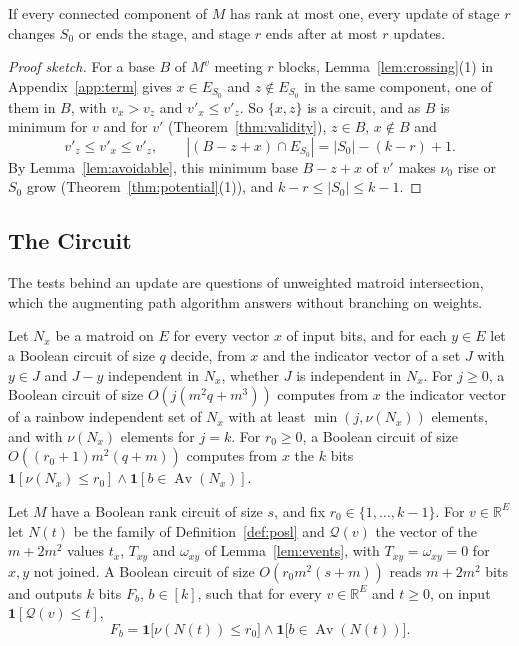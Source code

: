 \documentclass[runningheads,envcountsame]{llncs}
\newcommand{\R}{\mathbb R}
\newcommand{\Av}{\operatorname{Av}}
\begin{document}
\begin{corollary}
\label{cor:rankone}
If every connected component of $M$ has rank at most one, every update of stage $r$
changes $S_0$ or ends the stage, and stage $r$ ends after at most $r$ updates.
\end{corollary}

\begin{proof}[Proof sketch]
For a base $B$ of $M^{v}$ meeting $r$ blocks, Lemma~\ref{lem:crossing}(1) in
Appendix~\ref{app:term} gives $x\in E_{S_0}$ and $z\notin E_{S_0}$ in the same
component, one of them in $B$, with $v_x>v_z$ and $v'_x\le v'_z$.  So $\{x,z\}$
is a circuit, and as $B$ is minimum for $v$ and for $v'$
(Theorem~\ref{thm:validity}), $z\in B$, $x\notin B$ and
\[
  v'_z\le v'_x\le v'_z,\qquad |(B-z+x)\cap E_{S_0}|=|S_0|-(k-r)+1.
\]
By Lemma~\ref{lem:avoidable}, this minimum base $B-z+x$ of $v'$ makes $\nu_0$
rise or $S_0$ grow (Theorem~\ref{thm:potential}(1)), and $k-r\le|S_0|\le k-1$.
\end{proof}

\subsection{The Circuit}
\label{sec:circuit}

The tests behind an update are questions of unweighted matroid
intersection, which the augmenting path algorithm answers without branching on
weights.

\begin{lemma}
\label{lem:augment}
Let $N_x$ be a matroid on $E$ for every vector $x$ of input bits, and for each
$y\in E$ let a Boolean circuit of size $q$ decide, from $x$ and the indicator
vector of a set $J$ with $y\in J$ and $J-y$ independent in $N_x$, whether $J$ is
independent in $N_x$.  For $j\ge0$, a Boolean circuit of size
$O(j(m^{2}q+m^{3}))$ computes from $x$ the indicator vector of a rainbow
independent set of $N_x$ with at least $\min(j,\nu(N_x))$ elements, and with
$\nu(N_x)$ elements for $j=k$.  For $r_0\ge0$, a Boolean circuit of size
$O((r_0+1)m^{2}(q+m))$ computes from $x$ the $k$ bits
$\mathbf 1[\nu(N_x)\le r_0]\wedge\mathbf 1[b\in\Av(N_x)]$.
\end{lemma}

\begin{lemma}
\label{lem:observer}
Let $M$ have a Boolean rank circuit of size $s$, and fix
$r_0\in\{1,\ldots,k-1\}$.  For
$v\in\R^{E}$ let $N(t)$ be the family of Definition~\ref{def:posl} and
$\mathcal Q(v)$ the vector of the $m+2m^{2}$ values $t_x$,
$T_{xy}$ and $\omega_{xy}$ of Lemma~\ref{lem:events}, with $T_{xy}=\omega_{xy}=0$ for
$x,y$ not joined.  A Boolean circuit of size $O(r_0m^{2}(s+m))$ reads $m+2m^{2}$
bits and outputs $k$ bits $F_b$, $b\in[k]$, such that for every $v\in\R^{E}$ and
$t\ge0$, on input $\mathbf 1[\mathcal Q(v)\le t]$,
\[
  F_b=\mathbf 1\bigl[\nu(N(t))\le r_0\bigr]\wedge\mathbf 1\bigl[b\in\Av(N(t))\bigr].
\]
\end{lemma}
\end{document}
